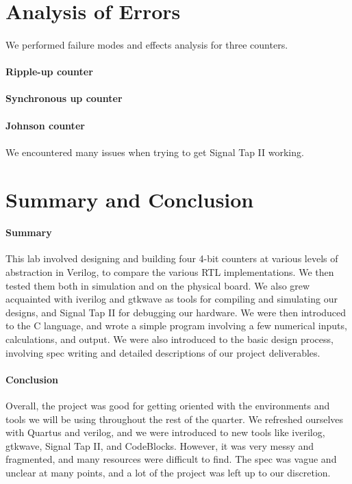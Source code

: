 \documentclass{article}
\begin{document}
\section{Analysis of Errors}

  \paragraph{}We performed failure modes and effects analysis for three counters.

  \paragraph{Ripple-up counter}

  \paragraph{Synchronous up counter} 

  \paragraph{Johnson counter}

  \paragraph{} We encountered many issues when trying to get Signal Tap II working. 

\section{Summary and Conclusion}

  \paragraph{Summary} This lab involved designing and building four 4-bit counters at various levels of abstraction in Verilog, to compare the various RTL implementations. We then tested them both in simulation and on the physical board. We also grew acquainted with iverilog and gtkwave as tools for compiling and simulating our designs, and Signal Tap II for debugging our hardware. We were then introduced to the C language, and wrote a simple program involving a few numerical inputs, calculations, and output. We were also introduced to the basic design process, involving spec writing and detailed descriptions of our project deliverables.

  \paragraph{Conclusion} Overall, the project was good for getting oriented with the environments and tools we will be using throughout the rest of the quarter. We refreshed ourselves with Quartus and verilog, and we were introduced to new tools like iverilog, gtkwave, Signal Tap II, and CodeBlocks. However, it was very messy and fragmented, and many resources were difficult to find. The spec was vague and unclear at many points, and a lot of the project was left up to our discretion.
\end{document}
